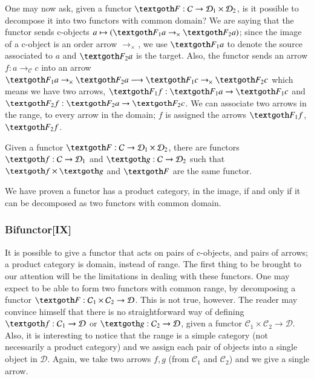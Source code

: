\documentclass [12pt]{book}
\begin{document}
One may now ask, given a functor $\textgoth F:\mathcal C\rightarrow\mathcal D_1\times\mathcal D_2$, is it possible to decompose it into two functors with common domain? We are saying that the functor sends c-objects $a\mapsto(\textgoth F_1a\rightarrow_\times\textgoth F_2a)$; since the image of a c-object is an order arrow $\rightarrow_\times$, we use $\textgoth F_1a$ to denote the source associated to $a$ and $\textgoth F_2a$ is the target. Also, the functor sends an arrow $f:a\rightarrow_\mathcal Cc$ into an arrow $\textgoth F_1a\rightarrow_\times\textgoth F_2a\longrightarrow\textgoth F_1c\rightarrow_\times\textgoth F_2c$ which means we have two arrows, $\textgoth F_1f:\textgoth F_1a\rightarrow\textgoth F_1c$ and $\textgoth F_2f:\textgoth F_2a\rightarrow\textgoth F_2c$. We can associate two arrows in the range, to every arrow in the domain; $f$ is assigned the arrows $\textgoth F_1f$, $\textgoth F_2f$.

\begin{proposition}Given a functor $\textgoth F:\mathcal C\rightarrow\mathcal D_1\times\mathcal D_2$, there are functors $\textgoth f:\mathcal C\rightarrow\mathcal D_1$ and $\textgoth g:\mathcal C\rightarrow\mathcal D_2$ such that $\textgoth f\times\textgoth g$ and $\textgoth F$ are the same functor.\label{common domain 2}\end{proposition}

We have proven a functor has a product category, in the image, if and only if it can be decomposed as two functors with common domain.

			\subsubsection{Bifunctor[IX]}It is possible to give a functor that acts on pairs of c-objects, and pairs of arrows; a product category is domain, instead of range. The first thing to be brought to our attention will be the limitations in dealing with these functors. One may expect to be able to form two functors with common range, by decomposing a functor $\textgoth F:\mathcal C_1\times\mathcal C_2\rightarrow\mathcal D$. This is not true, however. The reader may convince himself that there is no straightforward way of defining $\textgoth f:\mathcal C_1\rightarrow\mathcal D$ or $\textgoth g:\mathcal C_2\rightarrow\mathcal D$, given a functor $\mathcal C_1\times\mathcal C_2\rightarrow\mathcal D$.  Also, it is interesting to notice that the range is a simple category (not necessarily a product category) and we assign each pair of objects into a single object in $\mathcal D$. Again, we take two arrows $f,g$ (from $\mathcal C_1$ and $\mathcal C_2$) and we give a single arrow.
\end{document}

